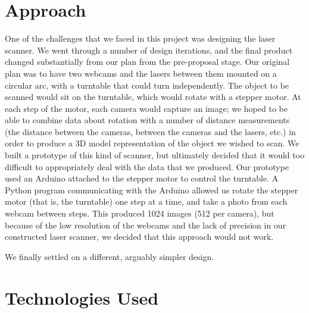 \documentclass[12pt, letterpaper]{article}
\begin{document}
\section{Approach}

One of the challenges that we faced in this project was designing the laser scanner.
We went through a number of design iterations, and the final product changed substantially
from our plan from the pre-proposal stage. Our original plan was to have two
webcams and the lasers between them mounted on a circular arc, with a turntable that
could turn independently. The object to be scanned would sit on the turntable, which
would rotate with a stepper motor. At each step of the motor, each camera would capture
an image; we hoped to be able to combine data about rotation with a number of distance
measurements (the distance between the cameras, between the cameras and the lasers, etc.)
in order to produce a 3D model representation of the object we wished to scan.
We built a prototype of this kind of scanner, but ultimately decided that it would %
too difficult to appropriately deal with the data that we produced. Our prototype used
an Arduino attached to the stepper motor to control the turntable. A Python program
communicating with the Arduino allowed us rotate the stepper motor (that is, the turntable)
one step at a time, and take a photo from each webcam between steps. This produced
1024 images (512 per camera), but because of the low resolution of the webcams and
the lack of precision in our constructed laser scanner, we decided that this approach
would not work.

We finally settled on a different, arguably simpler design.

\section{Technologies Used}
\end{document}
